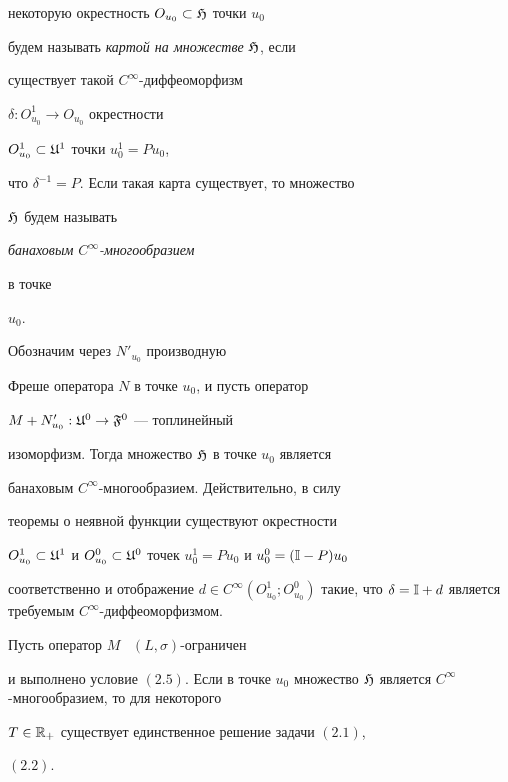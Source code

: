 некоторую окрестность $O_{u_{0}}\subset\frak H$ точки $u_{0}$


будем называть {\it картой на множестве} $\frak H$, если


существует такой $C^{\infty}$-диффеоморфизм\linebreak


$\delta:O^{1}_{u_{0}}\rightarrow O_{u_{0}}$ окрестности


$O^{1}_{u_{0}}\subset\frak U^{1}$ точки $u^{1}_{0}=Pu_{0}$,


что $\delta^{-1}=P$. Если такая карта существует, то множество


$\frak H$ будем называть {\it банаховым $C^{\infty}$-многообразием


в точке} $u_{0}$.








\begin{notes}


Обозначим через $N'_{u_{0}}$ производную


Фреше оператора $N$ в точке $u_{0}$, и пусть оператор


$M+N'_{u_{0}}:\frak U^{0}\rightarrow \frak F^{0}$ --- топлинейный


изоморфизм. Тогда множество $\frak H$ в точке $u_{0}$ является


банаховым $C^{\infty}$-многообразием. Действительно, в силу


теоремы о неявной функции существуют  окрестности


$O^{1}_{u_{0}}\subset\frak U^{1}$ и $O^{0}_{u_{0}}\subset\frak


U^{0}$ точек $u^{1}_{0}=Pu_{0}$ и $u^{0}_{0}=(\Bbb I-P)u_{0}$


соответственно и отображение $d\in


C^{\infty}(O^{1}_{u_{0}};O^{0}_{u_{0}})$ такие, что $\delta=\Bbb I


+d$ является требуемым $C^{\infty}$-диффеоморфизмом.


\end{notes}








\begin{thms}


Пусть оператор $M$ \ $(L,\sigma)$-ограничен


и выполнено условие $(2.5)$. Если в точке $u_{0}$ множество $\frak


H$ является $C^{\infty}$-многообразием, то для некоторого


$T\in\Bbb R_{+}$ существует единственное решение задачи $(2.1)$,


$(2.2)$.


\end{thms}








